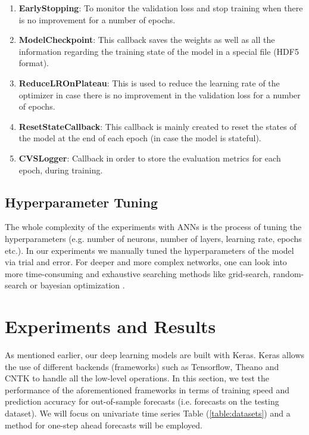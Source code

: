 \documentclass[a4paper, 12pt]{article}
\numberwithin{equation}{section}
\numberwithin{figure}{section}
\numberwithin{table}{section}
\begin{document}
	\begin{enumerate}
		\item \textbf{EarlyStopping}: To monitor the validation loss and stop training when there is no improvement for a number of epochs.
		
		\item  \textbf{ModelCheckpoint}: This callback saves the weights as well as all the information regarding the training state of the model in a special file (HDF5 format).
		
		\item \textbf{ReduceLROnPlateau}: This is used to reduce the learning rate of the optimizer in case there is no improvement in the validation loss for a number of epochs.
		
		\item \textbf{ResetStateCallback}: This callback is mainly created to reset the states of the model at the end of each epoch (in case the model is stateful).
		
		\item \textbf{CVSLogger}: Callback in order to store the evaluation metrics for each epoch, during training.
		
	\end{enumerate}

	\subsection{Hyperparameter Tuning}
	The whole complexity of the experiments with ANNs is the process of tuning the hyperparameters (e.g. number of neurons, number of layers, learning rate, epochs etc.). In our experiments we manually tuned the hyperparameters of the model via trial and error.
	For deeper and more complex networks, one can look into more time-consuming and exhaustive searching methods like grid-search, random-search or bayesian optimization \cite{Koch2017AutomatedHT, hyperparameter_tuning_blog}.
	
	\newpage
	
	\section{Experiments and Results}
	
	As mentioned earlier, our deep learning models are built with Keras. Keras allows the use of different backends (frameworks) such as Tensorflow, Theano and CNTK to handle all the low-level operations.
	In this section, we test the performance of the aforementioned frameworks in terms of training speed and prediction accuracy for out-of-sample forecasts (i.e. forecasts on the testing dataset). We will focus on univariate time series \textemdash Table (\ref{table:datasets}) and a method for one-step ahead forecasts will be employed.\par
	
\end{document}
